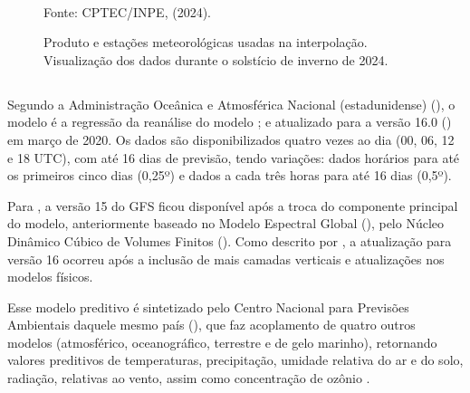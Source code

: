 \begin{figure}[htbp]
    \centering
    \caption{Produto  e estações meteorológicas usadas na interpolação. Visualização dos dados durante o solstício de inverno de 2024.} %
    \label{fig:samet_obs24}
    \hfill
    \\
    \small{Fonte: \acrshort{CPTEC}/\acrshort{INPE}, \citeauthor{Rozante2021SAMeT} (2024).}
\end{figure}

\subsection{}

\indent Segundo a Administração Oceânica e Atmosférica Nacional (estadunidense) \citeyear{GFS} (), o modelo  é a regressão da reanálise do modelo ; e atualizado para a versão 16.0 () em março de 2020. Os dados são disponibilizados quatro vezes ao dia (00, 06, 12 e 18 UTC), com até 16 dias de previsão, tendo variações: dados horários para até os primeiros cinco dias (0,25º) e dados a cada três horas para até 16 dias (0,5º).

\indent Para , a versão 15 do \acrshort{GFS} ficou disponível após a troca do componente principal do modelo, anteriormente baseado no Modelo Espectral Global (), pelo Núcleo Dinâmico Cúbico de Volumes Finitos (). Como descrito por , a atualização para versão 16 ocorreu após a inclusão de mais camadas verticais e atualizações nos modelos físicos. 

\indent Esse modelo preditivo é sintetizado pelo Centro Nacional para Previsões Ambientais daquele mesmo país (), que faz acoplamento de quatro outros modelos (atmosférico, oceanográfico, terrestre e de gelo marinho), retornando valores preditivos de temperaturas, precipitação, umidade relativa do ar e do solo, radiação, relativas ao vento, assim como concentração de ozônio \cite{GFS24NOAA}.

